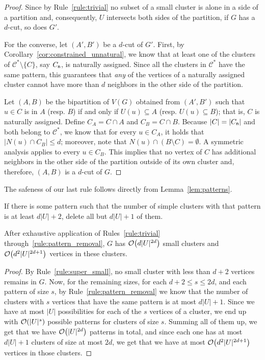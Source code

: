 \begin{proof}
    Since by Rule~\ref{rule:trivial} no subset of a small cluster is alone in a side of a partition and, consequently, $U$ intersects both sides of the partition, if $G$ has a $d$-cut, so does $G'$.

    For the converse, let $(A', B')$ be a $d$-cut of $G'$.
    First, by Corollary~\ref{cor:constrained_unnatural}, we know that at least one of the clusters of $\mathcal{C}^* \setminus \{C\}$, say $C_{{\sf n}}$, is naturally assigned.
    Since all the clusters in $\mathcal{C^*}$ have the same pattern, this guarantees that {\sl any} of the vertices of a naturally assigned cluster cannot have more than $d$ neighbors in the other side of the partition.

    Let $(A,B)$ be the bipartition of $V(G)$ obtained from $(A',B')$ such that $u \in C$ is in $A$ (resp. $B$) if and only if $U(u) \subseteq A$ (resp. $U(u) \subseteq B$); that is, $C$ is naturally assigned.
    Define $C_A = C \cap A$ and $C_B = C \cap B$.
    Because $|C| = |C_{{\sf n}}|$ and both belong to $\mathcal{C}^*$, we know that for every $u \in C_A$, it holds that $|N(u) \cap C_B| \leq d$; moreover, note that $N(u) \cap (B \setminus C) = \emptyset$. A symmetric analysis applies to every $u \in C_B$.
    This implies that no vertex of $C$ has additional neighbors in the other side of the partition outside of its own cluster and, therefore, $(A, B)$ is a $d$-cut of $G$.
\end{proof}

The safeness of our last rule follows directly from Lemma~\ref{lem:patterns}.

\begin{rrule}
    \label{rule:pattern_removal}
    If there is some pattern such that the number of simple clusters with that pattern is at least $d|U|+2$, delete all but $d|U|+1$ of them.
\end{rrule}

\begin{lemma}
    \label{lem:bound2}
    After exhaustive application of Rules~\ref{rule:trivial} through~\ref{rule:pattern_removal}, $G$ has $\mathcal{O}\!\left(d|U|^{2d}\right)$ small clusters and $\mathcal{O}\!\left(d^2|U|^{2d+1}\right)$ vertices in these clusters.
\end{lemma}

\begin{proof}
    By Rule~\ref{rule:super_small}, no small cluster with less than $d+2$ vertices remains in $G$.
    Now, for the remaining sizes, for each $d+2 \leq s \leq 2d$, and each pattern of size $s$, by Rule~\ref{rule:pattern_removal} we know that the number of clusters with $s$ vertices that have the same pattern is at most $d|U| + 1$.
    Since we have at most $|U|$ possibilities for each of the $s$ vertices of a cluster, we end up with $\mathcal{O}\!\left(|U|^{s}\right)$ possible patterns for clusters of size $s$.
    Summing all of them up, we get that we have $\mathcal{O}\!\left(|U|^{2d}\right)$ patterns in total, and since each one has at most $d|U| + 1$ clusters of size at most $2d$, we get that we have at most $\mathcal{O}\!\left(d^2|U|^{2d+1}\right)$ vertices in those clusters.
\end{proof}

